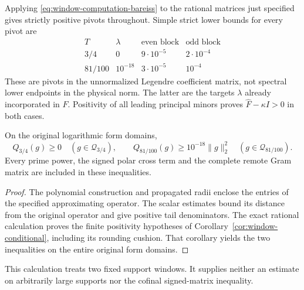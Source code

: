 Applying \eqref{eq:window-computation-bareiss} to the rational
matrices just specified gives strictly positive pivots throughout.
Simple strict lower bounds for every pivot are
\[
 \begin{array}{c|c|c|c}
 T&\lambda&\text{even block}&\text{odd block}\\\hline
 3/4&0&9\cdot10^{-5}&2\cdot10^{-4}\\
 81/100&10^{-18}&3\cdot10^{-5}&10^{-4}
 \end{array}
\]
These are pivots in the unnormalized Legendre coefficient
matrix, not spectral lower endpoints in the physical norm.
The latter are the targets $\lambda$ already incorporated in
$\widehat F$.  Positivity of all leading principal minors
proves $\widehat F-\kappa I>0$ in both cases.

\begin{theorem}
\label{thm:window-certified}
On the original logarithmic form domains,
\[
 Q_{3/4}(g)\ge0\quad(g\in\mathcal Q_{3/4}),\qquad
 Q_{81/100}(g)\ge10^{-18}\|g\|_2^2
                \quad(g\in\mathcal Q_{81/100}).
\]
Every prime power, the signed polar cross term and the complete
remote Gram matrix are included in these inequalities.
\end{theorem}
\begin{proof}
The polynomial construction and propagated radii enclose the
entries of the specified approximating operator.  The scalar
estimates bound its distance from the original operator and
give positive tail denominators.  The exact rational calculation
proves the finite positivity hypotheses of
Corollary~\ref{cor:window-conditional}, including its rounding
cushion.  That corollary yields the two inequalities on the
entire original form domains.
\end{proof}

This calculation treats two fixed support windows.  It supplies
neither an estimate on arbitrarily large supports nor the cofinal
signed-matrix inequality.
